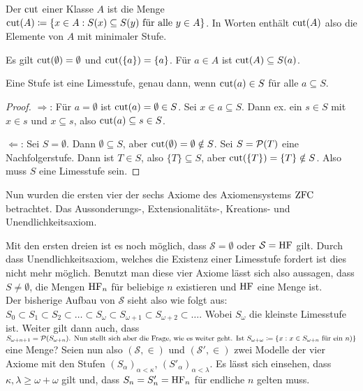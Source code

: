 \begin{definition}
	Der $\operatorname{cut}$ einer Klasse $A$ ist die Menge $\operatorname{cut}(A)\coloneqq\{x \in A : S(x)\subseteq S(y) \text{ für alle } y \in A\}$. In Worten enthält $\operatorname{cut}(A)$ also die Elemente von $A$ mit minimaler Stufe. 
\end{definition}

Es gilt $\operatorname{cut}(\emptyset)=\emptyset$ und $\operatorname{cut}(\{a\})=\{a\}$. Für $a\in A$ ist $\operatorname{cut}(A)\subseteq S(a)$.

\begin{satz}
	Eine Stufe ist eine Limesstufe, genau dann, wenn $\operatorname{cut}(a)\in S$ für alle $a\subseteq S$.
\end{satz}
\begin{proof}
	$\Rightarrow$: Für $a=\emptyset$ ist $\operatorname{cut}(a)=\emptyset \in S$. Sei $x \in a \subseteq S$. Dann ex. ein $s\in S$ mit $x\in s$ und $x\subseteq s$, also $\operatorname{cut}(a)\subseteq s \in S$.
	
	$\Leftarrow$: Sei $S=\emptyset$. Dann $\emptyset\subseteq S$, aber $\operatorname{cut}(\emptyset)=\emptyset\notin S$. 
	Sei $S=\mathcal{P}(T)$ eine Nachfolgerstufe. Dann ist $T\in S$, also $\{T\}\subseteq S$, aber $\operatorname{cut}(\{T\})=\{T\}\notin S$. Also muss $S$ eine Limesstufe sein.
\end{proof}


Nun wurden die ersten vier der sechs Axiome des Axiomensystems $\operatorname{ZFC}$ betrachtet. Das Aussonderungs-, Extensionalitäts-, Kreations- und Unendlichkeitsaxiom.

Mit den ersten dreien ist es noch möglich, dass $\mathcal{S}=\emptyset$ oder $\mathcal{S}=\HF$ gilt. Durch dass Unendlichkeitsaxiom, welches die Existenz einer Limesstufe fordert ist dies nicht mehr möglich. 
Benutzt man diese vier Axiome lässt sich also aussagen, dass $S\neq \emptyset$, die Mengen $\HF_n$ für beliebige $n$ existieren und $\HF$ eine Menge ist.
\\
Der bisherige Aufbau von $\mathcal{S}$ sieht also wie folgt aus: $S_0\subset S_1\subset S_2 \subset \dots \subset S_\omega \subset S_{\omega+1}\subset S_{\omega+2}\subset \dots$. Wobei $S_\omega$ die kleinste Limesstufe ist. Weiter gilt dann auch, dass $S_{\omega+n+1}=\Pot{S_{\omega+n})$. 
	
Nun stellt sich aber die Frage, wie es weiter geht. Ist $S_{\omega+\omega}\coloneqq\{x : x\in S_{\omega+n} \text{ für ein } n}\}$ eine Menge? Seien nun also $(\mathcal{S}, \in)$ und $(\mathcal{S}', \in)$ zwei Modelle der vier Axiome mit den Stufen $(S_\alpha)_{\alpha<\kappa}$, $(S'_\alpha)_{\alpha<\lambda}$. Es lässt sich einsehen, dass $\kappa,\lambda \geq \omega+\omega$ gilt und, dass $S_n=S'_n=\HF_n$ für endliche $n$ gelten muss.


